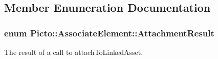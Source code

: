 \subsection{Member Enumeration Documentation}
\hypertarget{class_picto_1_1_associate_element_a4748629e8da6dae94a635082c340f512}{
\subsubsection[{Attachment\-Result}]{\setlength{\rightskip}{0pt plus 5cm}enum {\bf Picto\-::\-Associate\-Element\-::\-Attachment\-Result}}}\label{class_picto_1_1_associate_element_a4748629e8da6dae94a635082c340f512}


The result of a call to attach\-To\-Linked\-Asset. 

